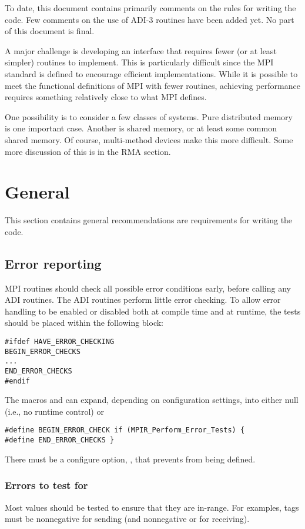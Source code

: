 \documentclass{article}
\begin{document}
To date, this document contains primarily comments on the rules for
writing the code.  Few comments on the use of ADI-3 routines have been
added yet.  No part of this document is final.

A major challenge is developing an interface that requires fewer (or
at least simpler) routines to implement.  This is particularly
difficult since the MPI standard is defined to encourage efficient
implementations.  While it is possible to meet the functional
definitions of MPI with fewer routines, achieving performance requires
something relatively close to what MPI defines.

One possibility is to consider a few classes of systems.  Pure
distributed memory is one important case.  Another is shared memory,
or at least some common shared memory.  Of course, multi-method
devices make this more difficult.  Some more discussion of this is in
the RMA section.

\section{General}
This section contains general recommendations are requirements for
writing the code.

\subsection{Error reporting}

MPI routines should check all possible error conditions early, before
calling any ADI routines.  The ADI routines perform little error
checking.  To allow error handling to be enabled or disabled both at compile
time 
and at runtime, the tests should be placed within the following block:
\begin{verbatim}
#ifdef HAVE_ERROR_CHECKING
BEGIN_ERROR_CHECKS
...
END_ERROR_CHECKS
#endif
\end{verbatim}
The macros  and  can
expand, depending on configuration settings, into either null (i.e.,
no runtime control) or 
\begin{verbatim}
#define BEGIN_ERROR_CHECK if (MPIR_Perform_Error_Tests) {
#define END_ERROR_CHECKS }
\end{verbatim}

There must be a configure option,
,  
that prevents  from being defined.

\subsubsection{Errors to test for}
Most values should be tested to ensure that they are in-range.  For examples,
tags must be nonnegative for sending (and nonnegative or
 for receiving). 
\end{document}
